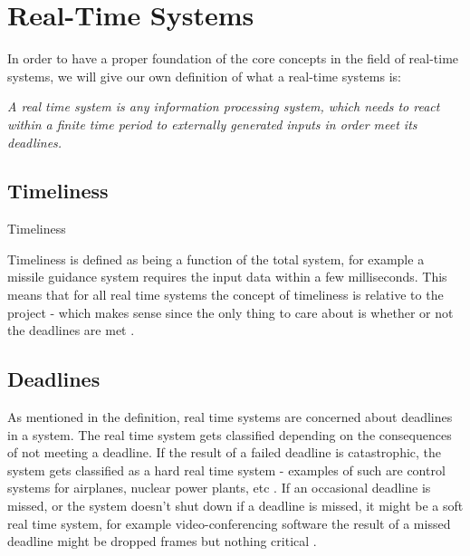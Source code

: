 \section{Real-Time Systems}
In order to have a proper foundation of the core concepts in the field of
real-time systems, we will give our own definition of what a real-time systems
is:

\begin{center}
\begin{minipage}{0.8\linewidth}
\textit{A real time system is any information processing system, which needs to
react within a finite time period to externally generated inputs in order meet
its deadlines.}
\end{minipage}
\end{center}


\subsection{Timeliness}
Timeliness 

Timeliness is defined as being a function of the total system, for example a
missile guidance system requires the input data within a few milliseconds. This
means that for all real time systems the concept of timeliness is relative to
the project - which makes sense since the only thing to care about is whether
or not the deadlines are met \Source.

\subsection{Deadlines}
As mentioned in the definition, real time systems are concerned about
deadlines in a system. The real time system gets classified depending on the
consequences of not meeting a deadline. If the result of a failed deadline is
catastrophic, the system gets classified as a hard real time system - examples
of such are control systems for airplanes, nuclear power plants, etc \Source.
If an occasional deadline is missed, or the system doesn't shut down if a
deadline is missed, it might be a soft real time system, for example
video-conferencing software the result of a missed deadline might be dropped
frames but nothing critical \Source.

